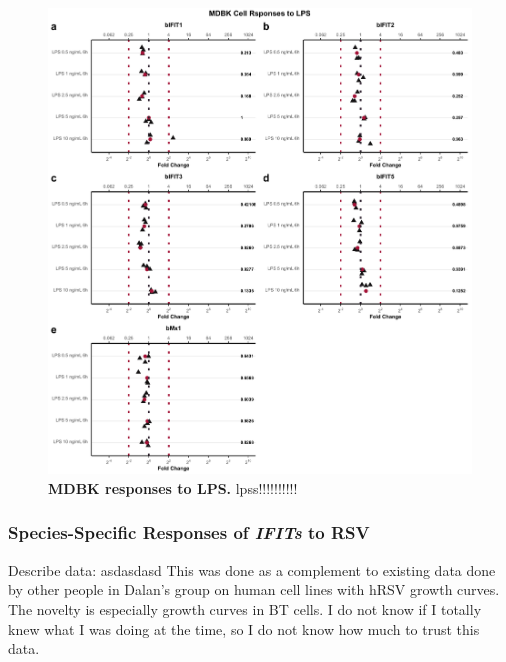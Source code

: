 \begin{figure}
    \centering
    \includegraphics[width=1\linewidth]{07. Chapter 2/Figs/02. Induction/02. mdbk_treat_lps.pdf}
    \caption[MDBK responses to LPS.]{\textbf{MDBK responses to LPS.} lpss!!!!!!!!!!}
    \label{MDBK responses to LPS}
\end{figure}













\subsubsection{Species-Specific Responses of \textit{IFITs} to RSV} \label{Species-Specific Responses of IFITs to RSV}

 \label{Growth curves of bovine RSV in bovine cell lines}
Describe data: \newline
asdasdasd \newline
This was done as a complement to existing data done by other people in Dalan’s group on human cell lines with hRSV growth curves. The novelty is especially growth curves in BT cells. I do not know if I totally knew what I was doing at the time, so I do not know how much to trust this data.  

